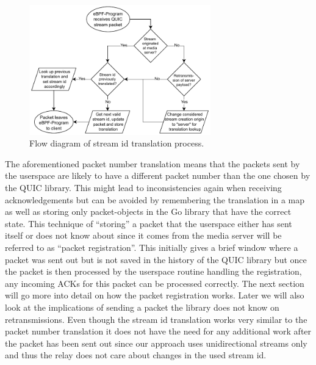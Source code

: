 \vspace{0.5cm}
\begin{figure}[H]
    \centering
    \includegraphics[width=0.7\textwidth]{figures/03_fast_relays/stream-id-translation.drawio.pdf}
    \caption[Stream id translation schematic]{Flow diagram of stream id translation process.}\label{fig:stream-id-translation}
\end{figure}
The aforementioned packet number translation means that the packets sent by the userspace are 
likely to have a different packet number than the one chosen by the QUIC library.
This might lead to inconsistencies again when receiving acknowledgements but can be avoided by 
remembering the translation in a map as well as storing only packet-objects in the 
Go library that have the correct state.
This technique of ``storing'' a packet that the userspace either has sent itself or does not know
about since it comes from the media server will be referred to as ``packet registration''.
This initially gives a brief window where a packet was sent out but is not saved in the history
of the QUIC library but once the packet is then processed by the userspace routine handling the 
registration, any incoming ACKs for this packet can be processed correctly.
The next section will go more into detail on how the packet registration works.
Later we will also look at the implications of sending a packet the library does not know on 
retransmissions.
Even though the stream id translation works very similar to the packet number translation it 
does not have the need for any additional work after the packet has been sent out since our 
approach uses unidirectional streams only and thus the relay does not care about changes in 
the used stream id. %

